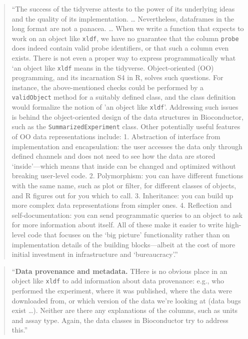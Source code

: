 \documentclass[]{tufte-book}
\begin{document}
\begin{quote}
``The success of the tidyverse attests to the power of its underlying ideas and
the quality of its implementation. \ldots{} Nevertheless, dataframes in the long
format are not a panacea. \ldots{} When we write a function that expects to work on
an object like \texttt{xldf}, we have no guarantee that the column \texttt{probe} does indeed
contain valid probe identifiers, or that such a column even exists. There is not
even a proper way to express programmatically what `an object like \texttt{xldf} means
in the tidyverse. Object-oriented (OO) programming, and its incarnation S4 in R,
solves such questions. For instance, the above-mentioned checks could be
performed by a \texttt{validObject} method for a suitably defined class, and the class
definition would formalize the notion of 'an object like \texttt{xldf}'. Addressing
such issues is behind the object-oriented design of the data structures in
Bioconductor, such as the \texttt{SummarizedExperiment} class. Other potentially useful
features of OO data representations include: 1. Abstraction of interface from
implementation and encapsulation: the user accesses the data only through
defined channels and does not need to see how the data are stored
`inside'---which means that inside can be changed and optimized without breaking
user-level code. 2. Polymorphism: you can have different functions with the same
name, such as plot or filter, for different classes of objects, and R figures
out for you which to call. 3. Inheritance: you can build up more complex data
representations from simpler ones. 4. Reflection and self-documentation: you can
send programmatic queries to an object to ask for more information about itself.
All of these make it easier to write high-level code that focuses on the `big
picture' functionality rather than on implementation details of the building
blocks---albeit at the cost of more initial investment in infrastructure and
`bureaucracy'.'' \citep{holmes2018modern}
\end{quote}

\begin{quote}
``\textbf{Data provenance and metadata.} THere is no obvious place in an object like
\texttt{xldf} to add information about data provenance: e.g., who performed the
experiment, where it was published, where the data were downloaded from, or
which version of the data we're looking at (data bugs exist \ldots). Neither are
there any explanations of the columns, such as units and assay type. Again, the
data classes in Bioconductor try to address this.'' \citep{holmes2018modern}
\end{quote}
\end{document}
